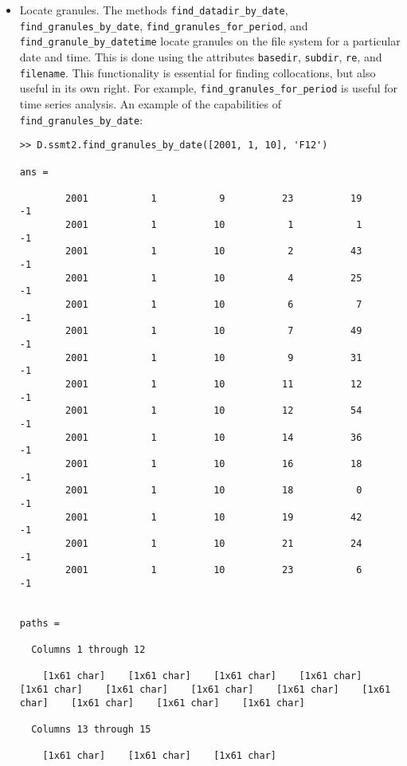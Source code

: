 \documentclass[a4paper,10pt]{article}
\begin{document}
\begin{itemize}
\item Locate granules. The methods \lstinline!find_datadir_by_date!,
\lstinline|find_granules_by_date|, \lstinline|find_granules_for_period|,
and \lstinline|find_granule_by_datetime|
locate granules on the file system for a particular date and time.
This is done using the attributes \lstinline|basedir|, \lstinline|subdir|,
\lstinline|re|, and \lstinline|filename|.
This functionality is essential for finding collocations, but also useful in
its own right.
For example, \lstinline|find_granules_for_period| is useful for time series
analysis.
An example of the capabilities of \lstinline|find_granules_by_date|:
\begin{lstlisting}
>> D.ssmt2.find_granules_by_date([2001, 1, 10], 'F12')

ans =

        2001           1           9          23          19          -1
        2001           1          10           1           1          -1
        2001           1          10           2          43          -1
        2001           1          10           4          25          -1
        2001           1          10           6           7          -1
        2001           1          10           7          49          -1
        2001           1          10           9          31          -1
        2001           1          10          11          12          -1
        2001           1          10          12          54          -1
        2001           1          10          14          36          -1
        2001           1          10          16          18          -1
        2001           1          10          18           0          -1
        2001           1          10          19          42          -1
        2001           1          10          21          24          -1
        2001           1          10          23           6          -1


paths = 

  Columns 1 through 12

    [1x61 char]    [1x61 char]    [1x61 char]    [1x61 char]    [1x61 char]    [1x61 char]    [1x61 char]    [1x61 char]    [1x61 char]    [1x61 char]    [1x61 char]    [1x61 char]

  Columns 13 through 15

    [1x61 char]    [1x61 char]    [1x61 char]


\end{lstlisting}
\end{itemize}
\end{document}
